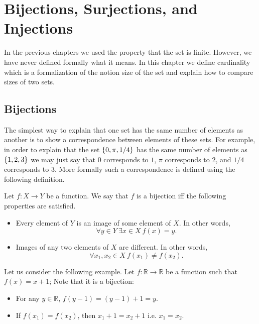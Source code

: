 \chapter{Bijections, Surjections, and Injections}
\label{chapter:bijections-surjections-injections}

In the previous chapters we used the property that the set is finite. However,
we have never defined formally what it means. In this chapter we define
cardinality which is a formalization of the notion size of the set and explain
how to compare sizes of two sets.

\section{Bijections}
The simplest way to explain that one set has the same number of elements as
another is to show a correspondence between elements of these sets. For example,
in order to explain that the set $\set{0, \pi, 1 / 4}$ has the same number of
elements as $\set{1, 2, 3}$ we may just say that $0$ corresponds to $1$,
$\pi$ corresponds to $2$, and $1 / 4$ corresponds to $3$. More formally such a
correspondence is defined using the following definition.
\begin{definition}
  Let $f : X \to Y$ be a function. We say that $f$ is a bijection iff the
  following properties are satisfied.
  \begin{itemize}
    \item Every element of $Y$ is an image of some element of $X$. In other
    words,
      \[
          \forall y \in Y~\exists x \in X\ f(x) = y.
      \]
    \item Images of any two elements
      of $X$ are different. In other words,
      \[
          \forall x_1, x_2 \in X\ f(x_1) \neq f(x_2).
      \]
    \end{itemize}
\end{definition}

Let us consider the following example. Let $f : \mathbb{R} \to \mathbb{R}$ be a
function such that $f(x) = x + 1$; Note that it is a bijection:
\begin{itemize}
  \item For any $y \in \mathbb{R}$, $f(y - 1) = (y - 1) + 1 = y$.
  \item If $f(x_1) = f(x_2)$, then $x_1 + 1 = x_2 + 1$ i.e. $x_1 = x_2$.
\end{itemize}


